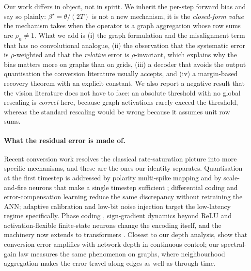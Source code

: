 \documentclass[10pt,twocolumn]{article}
\newcommand{\betastar}{\beta^{\star}}
\newcommand{\rhon}{\rho_{n}}
\begin{document}
Our work differs in object, not in spirit. We inherit the per-step forward bias and say so plainly:
$\betastar = \theta/(2T)$ is not a new mechanism, it is the \emph{closed-form value} the mechanism
takes when the operator is a graph aggregation whose row sums are $\rhon \neq 1$. What we add is
(i) the graph formulation and the misalignment term that has no convolutional analogue, (ii) the
observation that the systematic error is $\rho$-weighted and that the \emph{relative} error is
$\rho$-invariant, which explains why the bias matters more on graphs than on grids, (iii) a decoder
that avoids the output quantisation the conversion literature usually accepts, and (iv) a
margin-based recovery theorem with an explicit constant. We also report a negative result that the
vision literature does not have to face: an absolute threshold with no global rescaling is
\emph{correct} here, because graph activations rarely exceed the threshold, whereas the standard
rescaling would be wrong because it assumes unit row sums.

\paragraph{What the residual error is made of.} Recent conversion work resolves the classical
rate-saturation picture into more specific mechanisms, and these are the ones our identity
separates. Quantisation at the first timestep is addressed by polarity multi-spike mapping
\citep{zhang2025quantization} and by scale-and-fire neurons that make a single timestep sufficient
\citep{chen2025onetimestep}; differential coding \citep{huang2025differential} and
error-compensation learning \citep{liu2025errorcomp} reduce the same discrepancy without retraining
the ANN; adaptive calibration \citep{wang2024adaptivecal} and low-bit noise injection
\citep{li2024noiseadaptor} target the low-latency regime specifically. Phase coding
\citep{hwang2024onespike}, sign-gradient dynamics beyond ReLU \citep{oh2024signgd} and
activation-flexible finite-state neurons \citep{jia2026activation} change the encoding itself, and
the machinery now extends to transformers \citep{huang2025spiketrans,wang2025trainingfree}. Closest
to our depth analysis, \citet{xu2026erroramp} show that conversion error amplifies with network
depth in continuous control; our spectral-gain law measures the same phenomenon on graphs, where
neighbourhood aggregation makes the error travel along edges as well as through time.
\end{document}
